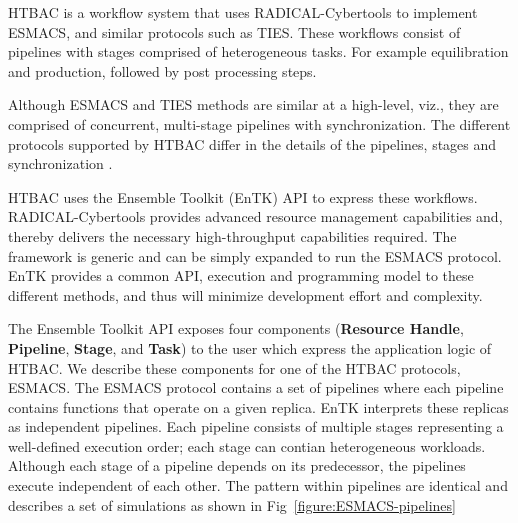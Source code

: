 


HTBAC is a workflow system that uses RADICAL-Cybertools to implement ESMACS,
and similar protocols such as TIES. These workflows consist of pipelines with
stages comprised of heterogeneous tasks. For example equilibration and
production, followed by post processing steps. 

Although ESMACS and TIES methods are similar at a high-level, viz., they are
comprised of concurrent, multi-stage pipelines with synchronization. The different protocols supported by HTBAC differ in the details of the
pipelines, stages and synchronization \cite{Bhati2017}. 

HTBAC uses the Ensemble Toolkit (EnTK) API to express these workflows. RADICAL-Cybertools
provides advanced resource management capabilities and, thereby delivers the
necessary high-throughput capabilities required. The framework is generic and
can be simply expanded to run the ESMACS protocol. EnTK provides a common API,
execution and programming model to these different methods, and thus will
minimize development effort and complexity.

The Ensemble Toolkit API exposes four components (\textbf{Resource
Handle}, \textbf{Pipeline}, \textbf{Stage}, and \textbf{Task}) to the user which express the
application logic of HTBAC. We describe these components for one of the HTBAC
protocols, ESMACS. The ESMACS protocol contains a set of pipelines where each
pipeline contains functions that operate on a given replica. EnTK interprets these replicas as independent pipelines. Each pipeline consists of multiple stages representing a well-defined execution order; each stage can contian heterogeneous workloads. Although each stage of a pipeline depends on its predecessor, the pipelines execute independent of each other. The pattern within pipelines are identical and describes a set of simulations as shown in Fig~\ref{figure:ESMACS-pipelines}

